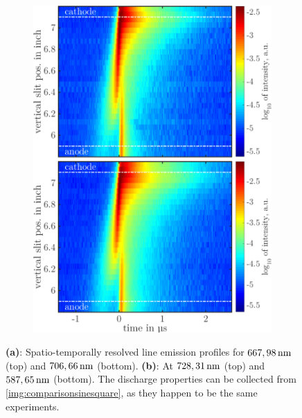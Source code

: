 \documentclass[a4paper,10pt,twoside]{article}
\newcommand{\fett}[1]{\textbf{#1}}
\begin{document}
\begin{figure}
\begin{subfigure}[t]{0.49\textwidth}
					\includegraphics[width=\textwidth]{figures/lineratio/728u587.pdf}
					\caption*{}
					\label{img:728u587nm}
				\end{subfigure}
				\caption{\fett{(a)}: Spatio-temporally resolved line emission profiles for $\unit[667,98]{nm}$ (top) and $\unit[706,66]{nm}$ (bottom). \fett{(b)}: At $\unit[728,31]{nm}$ (top) and $\unit[587,65]{nm}$ (bottom). The discharge properties can be collected from \autoref{img:comparisonsinesquare}, as they happen to be the same experiments.}
				\label{img:comparisonemissionline}
			\end{figure}
			
\end{document}
